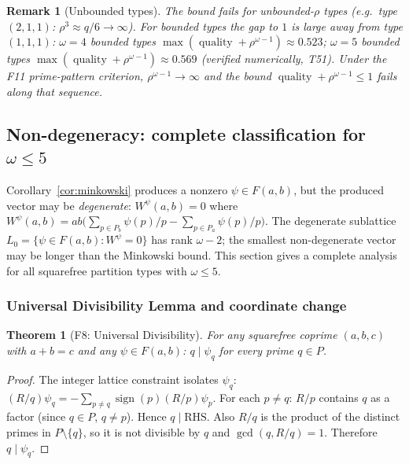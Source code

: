 \documentclass[12pt]{article}
\newtheorem{theorem}{Theorem}
\newtheorem{remark}{Remark}
\theoremstyle{definition}
\begin{document}
\begin{remark}[Unbounded types]
  The bound fails for unbounded-$\rho$ types (e.g.\ type $(2,1,1)$: $\rho^3 \approx q/6
  \to \infty$).  For bounded types the gap to $1$ is large away from type $(1,1,1)$:
  $\omega=4$ bounded types $\max(\operatorname{quality}+\rho^{\omega-1})
  \approx 0.523$;
  $\omega=5$ bounded types $\max(\operatorname{quality}+\rho^{\omega-1})
  \approx 0.569$ (verified numerically, T51).
  Under the F11 prime-pattern criterion, $\rho^{\omega-1}\to\infty$ and the
  bound $\operatorname{quality}+\rho^{\omega-1}\le1$ fails along that sequence.
\end{remark}

\subsection{Non-degeneracy: complete classification for $\omega \le 5$}

Corollary~\ref{cor:minkowski} produces a nonzero $\psi \in F(a,b)$, but the
produced vector may be \emph{degenerate}: $W^\psi(a,b) = 0$ where
$W^\psi(a,b) = ab\bigl(\sum_{p \in P_b} \psi(p)/p - \sum_{p \in P_a} \psi(p)/p\bigr)$.
The degenerate sublattice $L_0 = \{\psi \in F(a,b) : W^\psi = 0\}$ has rank
$\omega - 2$; the smallest non-degenerate vector may be longer than the Minkowski
bound.  This section gives a complete analysis for all squarefree partition types
with $\omega \le 5$.

\subsubsection*{Universal Divisibility Lemma and coordinate change}

\begin{theorem}[F8: Universal Divisibility]\label{thm:div}
  For any squarefree coprime $(a,b,c)$ with $a+b=c$ and any $\psi \in F(a,b)$:
  $q \mid \psi_q$ for every prime $q \in P$.
\end{theorem}

\begin{proof}
  The integer lattice constraint isolates $\psi_q$:
  $(R/q)\psi_q = -\sum_{p \ne q} \operatorname{sign}(p)(R/p)\psi_p$.
  For each $p \ne q$: $R/p$ contains $q$ as a factor (since $q \in P$, $q \ne p$).
  Hence $q \mid \text{RHS}$.  Also $R/q$ is the product of the distinct primes
  in $P\setminus\{q\}$, so it is not divisible by $q$ and
  $\gcd(q, R/q)=1$.  Therefore $q \mid \psi_q$.
\end{proof}
\end{document}
